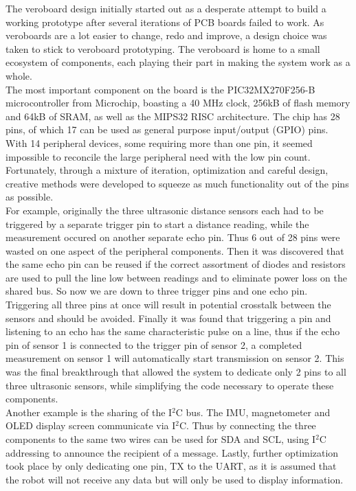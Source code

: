 The veroboard design initially started out as a desperate attempt to build a working prototype after several iterations of PCB boards failed to work. As veroboards are a lot easier to change, redo and improve, a design choice was taken to stick to veroboard prototyping. The veroboard is home to a small ecosystem of components, each playing their part in making the system work as a whole. \\

The most important component on the board is the PIC32MX270F256-B microcontroller from Microchip, boasting a 40 MHz clock, 256kB of flash memory and 64kB of SRAM, as well as the MIPS32 RISC architecture. The chip has 28 pins, of which 17 can be used as general purpose input/output (GPIO) pins. With 14 peripheral devices, some requiring more than one pin, it seemed impossible to reconcile the large peripheral need with the low pin count. Fortunately, through a mixture of iteration, optimization and careful design, creative methods were developed to squeeze as much functionality out of the pins as possible. \\

For example, originally the three ultrasonic distance sensors each had to be triggered by a separate trigger pin to start a distance reading, while the measurement occured on another separate echo pin. Thus 6 out of 28 pins were wasted on one aspect of the peripheral components. Then it was discovered that the same echo pin can be reused if the correct assortment of diodes and resistors are used to pull the line low between readings and to eliminate power loss on the shared bus. So now we are down to three trigger pins and one echo pin. Triggering all three pins at once will result in potential crosstalk between the sensors and should be avoided. Finally it was found that triggering a pin and listening to an echo has the same characteristic pulse on a line, thus if the echo pin of sensor 1 is connected to the trigger pin of sensor 2, a completed measurement on sensor 1 will automatically start transmission on sensor 2. This was the final breakthrough that allowed the system to dedicate only 2 pins to all three ultrasonic sensors, while simplifying the code necessary to operate these components. \\

Another example is the sharing of the I$^2$C bus. The IMU, magnetometer and OLED display screen communicate via I$^2$C. Thus by connecting the three components to the same two wires can be used for SDA and SCL, using I$^2$C addressing to announce the recipient of a message. Lastly, further optimization took place by only dedicating one pin, TX to the UART, as it is assumed that the robot will not receive any data but will only be used to display information. \\

